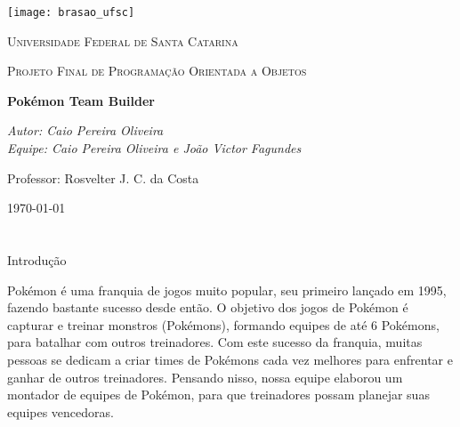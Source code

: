 \documentclass[
	article,			%
	12pt,				%
	oneside,			%
	a4paper,			%
	english,			%
	brazil,				%
	sumario=tradicional
	]{abntex2}
\begin{document}

\frenchspacing 



\begin{center}
\thispagestyle{empty}
\texttt{[image: brasao\_ufsc]}\par\vspace{1cm}
{\scshape\Large Universidade Federal de Santa Catarina \par}
\vspace{1cm}
{\scshape\Large Projeto Final de Programação Orientada a Objetos\par}
\vspace{1.5cm}
{\huge\bfseries Pokémon Team Builder\par}
\vspace{2cm}
{\Large\itshape Autor: Caio Pereira Oliveira\\Equipe: Caio Pereira Oliveira e João Victor Fagundes\par}
\vfill
{\Large Professor: Rosvelter J. C. da Costa}

\vspace{\fill}
{\large \today\par}

\end{center}

\textual

\newpage
\section*{}

\begin{center}
{\HUGE Introdução}
\end{center}

Pokémon é uma franquia de jogos muito popular, seu primeiro lançado em 1995, fazendo bastante sucesso desde então. O objetivo dos jogos de Pokémon é capturar e treinar monstros (Pokémons), formando equipes de até 6 Pokémons, para batalhar com outros treinadores. Com este sucesso da franquia, muitas pessoas se dedicam a criar times de Pokémons cada vez melhores para enfrentar e ganhar de outros treinadores. Pensando nisso, nossa equipe elaborou um montador de equipes de Pokémon, para que treinadores possam planejar suas equipes vencedoras.
\end{document}
